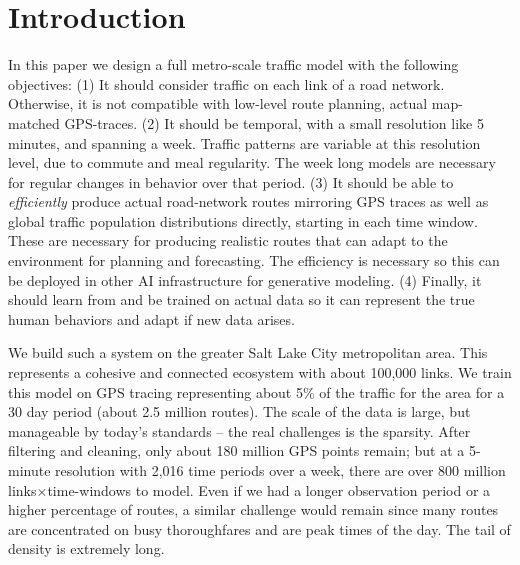 \documentclass[sigconf, review]{acmart}
\begin{document}


\maketitle



\section{Introduction}
In this paper we design a full metro-scale traffic model with the following objectives:  
(1)  It should consider traffic on each link of a road network.  Otherwise, it is not compatible with low-level route planning, actual map-matched GPS-traces.  
(2)  It should be temporal, with a small resolution like 5 minutes, and spanning a week.  Traffic patterns are variable at this resolution level, due to commute and meal regularity.  The week long models are necessary for regular changes in behavior over that period.  
(3)  It should be able to \emph{efficiently} produce actual road-network routes mirroring GPS traces as well as global traffic population distributions directly, starting in each time window.  These are necessary for producing realistic routes that can adapt to the environment for planning and forecasting.  The efficiency is necessary so this can be deployed in other AI infrastructure for generative modeling.  
(4)  Finally, it should learn from and be trained on actual data so it can represent the true human behaviors and adapt if new data arises.  

We build such a system on the greater Salt Lake City metropolitan area.  This represents a cohesive and connected ecosystem with about 100,000 links.  We train this model on GPS tracing representing about 5\% of the traffic for the area for a 30 day period (about 2.5 million routes).  The scale of the data is large, but manageable by today's standards -- the real challenges is the sparsity.  After filtering and cleaning, only about 180 million GPS points remain; but at a 5-minute resolution with 2,016 time periods over a week, there are over 800 million links$\times$time-windows to model.  Even if we had a longer observation period or a higher percentage of routes, a similar challenge would remain since many routes are concentrated on busy thoroughfares and are peak times of the day.  The tail of density is extremely long. 
\end{document}

